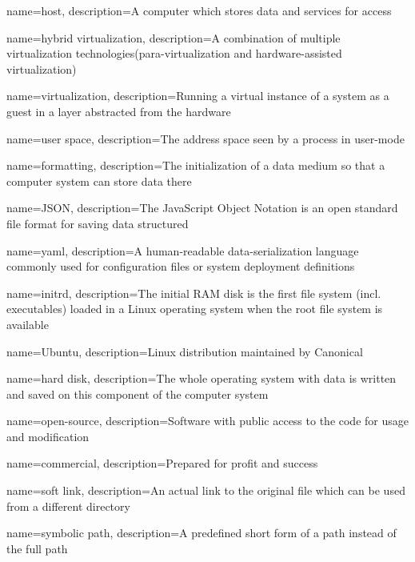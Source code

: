 {
    name={host},
    description={A computer which stores data and services for access}
}

{
    name={hybrid virtualization},
    description={A combination of multiple virtualization technologies(para-virtualization and hardware-assisted virtualization)}
}

{
    name={virtualization},
    description={Running a virtual instance of a system as a guest in a layer abstracted from the hardware}
}

{
    name={user space},
    description={The address space seen by a process in user-mode}
}


{
    name={formatting},
    description={The initialization of a data medium so that a computer system can store data there}
}

{
    name={JSON},
    description={The JavaScript Object Notation is an open standard file format for saving data structured}
}

{
    name={yaml},
    description={A human-readable data-serialization language commonly used for configuration files or system deployment definitions}
}

{
    name={initrd},
    description={The initial RAM disk is the first file system (incl. executables) loaded in a Linux operating system when the root file system is available}
}

{
    name={Ubuntu},
    description={Linux distribution maintained by Canonical}
}

{
    name={hard disk},
    description={The whole operating system with data is written and saved on this component of the computer system}
}

{
    name={open-source},
    description={Software with public access to the code for usage and modification}
}

{
    name={commercial},
    description={Prepared for profit and success}
}

{
    name={soft link},
    description={An actual link to the original file which can be used from a different directory}
}

{
    name={symbolic path},
    description={A predefined short form of a path instead of the full path}
}

